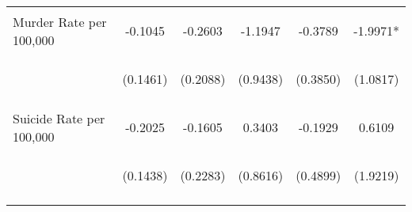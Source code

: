 \begin{center}
\begin{tabular}{lccccc}
\noalign{\smallskip}Murder Rate per 100,000 & \begin{scriptsize}-0.1045\end{scriptsize} & \begin{scriptsize}-0.2603\end{scriptsize} & \begin{scriptsize}-1.1947\end{scriptsize} & \begin{scriptsize}-0.3789\end{scriptsize} & \begin{scriptsize}-1.9971*\end{scriptsize}\\
 & \begin{scriptsize}(0.1461)\end{scriptsize} & \begin{scriptsize}(0.2088)\end{scriptsize} & \begin{scriptsize}(0.9438)\end{scriptsize} & \begin{scriptsize}(0.3850)\end{scriptsize} & \begin{scriptsize}(1.0817)\end{scriptsize}\\
\noalign{\smallskip}Suicide Rate per 100,000 & \begin{scriptsize}-0.2025\end{scriptsize} & \begin{scriptsize}-0.1605\end{scriptsize} & \begin{scriptsize}0.3403\end{scriptsize} & \begin{scriptsize}-0.1929\end{scriptsize} & \begin{scriptsize}0.6109\end{scriptsize}\\
 & \begin{scriptsize}(0.1438)\end{scriptsize} & \begin{scriptsize}(0.2283)\end{scriptsize} & \begin{scriptsize}(0.8616)\end{scriptsize} & \begin{scriptsize}(0.4899)\end{scriptsize} & \begin{scriptsize}(1.9219)\end{scriptsize}\\
\noalign{\smallskip}\hline\end{tabular}\\
\end{center}
